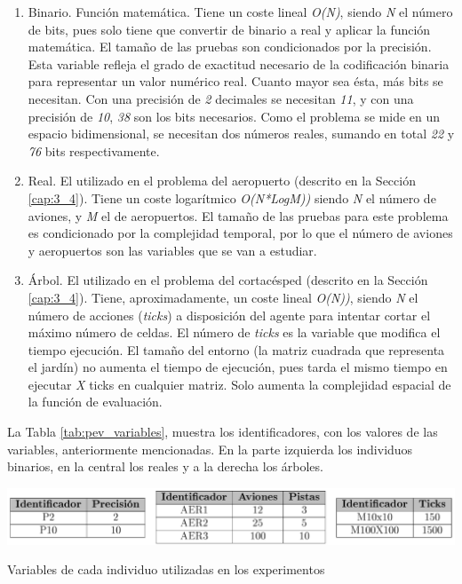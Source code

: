	\begin{enumerate}
		\item Binario. Función matemática. Tiene un coste lineal \textit{O(N)}, siendo \textit{N} el número de bits, pues solo tiene que convertir de binario a real y aplicar la función matemática. El tamaño de las pruebas son condicionados por la precisión. Esta variable refleja el grado de exactitud necesario de la codificación binaria para representar un valor numérico real. Cuanto mayor sea ésta, más bits se necesitan. Con una precisión de \textit{2} decimales se necesitan \textit{11}, y con una precisión de \textit{10}, \textit{38} son los bits necesarios. Como el problema se mide en un espacio bidimensional, se necesitan dos números reales, sumando en total \textit{22} y \textit{76} bits respectivamente. 
		\item Real. El utilizado en el problema del aeropuerto (descrito en la Sección \ref{cap:3_4}). Tiene un coste logarítmico \textit{O(N*LogM))} siendo \textit{N} el número de aviones, y \textit{M} el de aeropuertos. El tamaño de las pruebas para este problema es condicionado por la complejidad temporal, por lo que el número de aviones y aeropuertos son las variables que se van a estudiar.						
		\item Árbol. El utilizado en el problema del cortacésped (descrito en la Sección \ref{cap:3_4}). Tiene, aproximadamente, un coste lineal \textit{O(N))}, siendo \textit{N} el número de acciones (\textit{ticks}) a disposición del agente para intentar cortar el máximo número de celdas. El número de \textit{ticks} es la variable que modifica el tiempo ejecución. El tamaño del entorno (la matriz cuadrada que representa el jardín) no aumenta el tiempo de ejecución, pues tarda el mismo tiempo en ejecutar \textit{X} ticks en cualquier matriz. Solo aumenta la complejidad espacial de la función de evaluación. 
	\end{enumerate}
	
	
	
		La Tabla \ref{tab:pev_variables}, muestra los identificadores, con los valores de las variables, anteriormente mencionadas. En la parte izquierda los individuos binarios, en la central los reales y a la derecha los árboles.
		
		\begin{table}[!h]
			\centering
			\includegraphics[width=1\textwidth]{images/chapter_4/tab_pev_variables}		
			\caption{Variables de cada individuo utilizadas en los experimentos}
			\label{tab:pev_variables}
		\end{table}		
	
